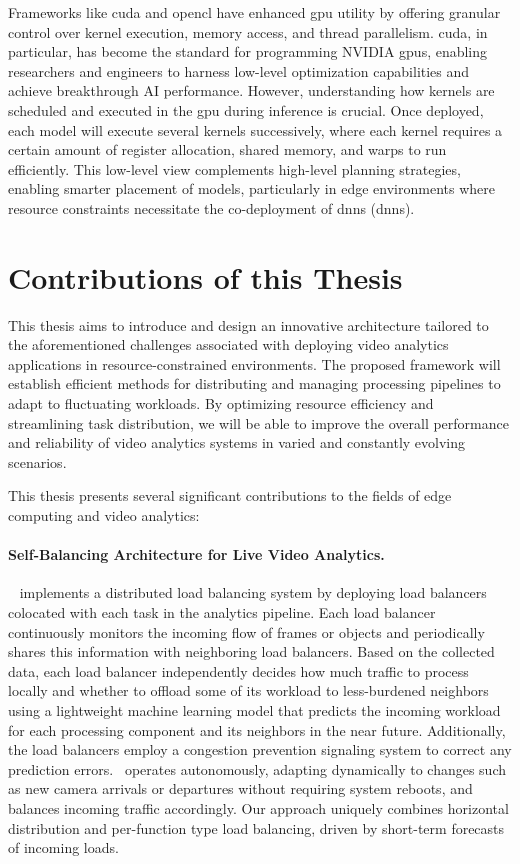 Frameworks like \acrfull{cuda} and \acrfull{opencl} have enhanced \acrshort{gpu} utility by offering granular control over kernel execution, memory access, and thread parallelism. \acrshort{cuda}, in particular, has become the standard for programming NVIDIA \acrshort{gpu}s, enabling researchers and engineers to harness low-level optimization capabilities and achieve breakthrough AI performance. However, understanding how kernels are scheduled and executed in the \acrshort{gpu} during inference is crucial. Once deployed, each model will execute several kernels successively, where each kernel requires a certain amount of register allocation, shared memory, and warps to run efficiently. This low-level view complements high-level planning strategies, enabling smarter placement of models, particularly in edge environments where resource constraints necessitate the co-deployment of \acrlong{dnn}s (\acrshort{dnn}s).



\section{Contributions of this Thesis}

This thesis aims to introduce and design an innovative architecture tailored to the aforementioned challenges associated with deploying video analytics applications in resource-constrained environments. The proposed framework will establish efficient methods for distributing and managing processing pipelines to adapt to fluctuating workloads. By optimizing resource efficiency and streamlining task distribution, we will be able to improve the overall performance and reliability of video analytics systems in varied and constantly evolving scenarios.

This thesis presents several significant contributions to the fields of edge computing and video analytics:

\paragraph{Self-Balancing Architecture for Live Video Analytics.}~\videojam{} implements a distributed load balancing system by deploying load balancers colocated with each task in the analytics pipeline. Each load balancer continuously monitors the incoming flow of frames or objects and periodically shares this information with neighboring load balancers. Based on the collected data, each load balancer independently decides how much traffic to process locally and whether to offload some of its workload to less-burdened neighbors using a lightweight machine learning model that predicts the incoming workload for each processing component and its neighbors in the near future. Additionally, the load balancers employ a congestion prevention signaling system to correct any prediction errors.~\videojam{} operates autonomously, adapting dynamically to changes such as new camera arrivals or departures without requiring system reboots, and balances incoming traffic accordingly. Our approach uniquely combines horizontal distribution and per-function type load balancing, driven by short-term forecasts of incoming loads.

